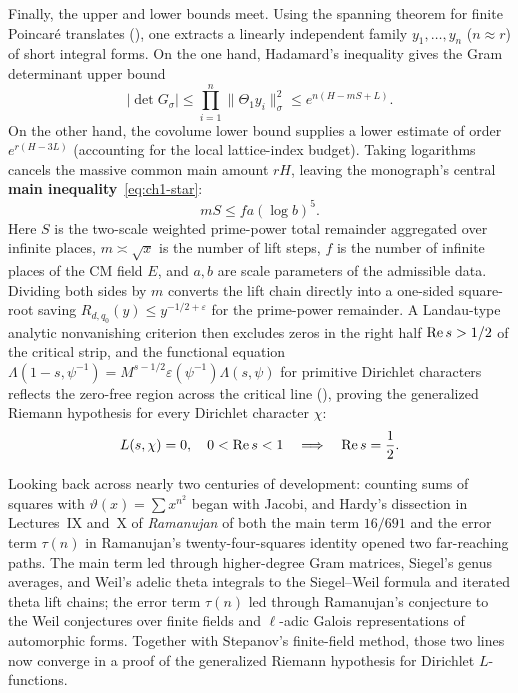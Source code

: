 Finally, the upper and lower bounds meet. Using the spanning theorem for finite Poincaré translates (), one extracts a linearly independent family $y_1,\ldots,y_n$ ($n\approx r$) of short integral forms. On the one hand, Hadamard's inequality gives the Gram determinant upper bound
\[
|\det G_\sigma|\le\prod_{i=1}^{n}\|\Theta_1 y_i\|_\sigma^2\le e^{n(H-mS+L)}.
\]
On the other hand, the covolume lower bound supplies a lower estimate of order $e^{r(H-3L)}$ (accounting for the local lattice-index budget). Taking logarithms cancels the massive common main amount $rH$, leaving the monograph's central \textbf{main inequality}~\eqref{eq:ch1-star}:
\[
mS\le fa(\log b)^5.
\]
Here $S$ is the two-scale weighted prime-power total remainder aggregated over infinite places, $m\asymp\sqrt{x}$ is the number of lift steps, $f$ is the number of infinite places of the CM field $E$, and $a,b$ are scale parameters of the admissible data. Dividing both sides by $m$ converts the lift chain directly into a one-sided square-root saving $R_{d,q_0}(y)\le y^{-1/2+\varepsilon}$ for the prime-power remainder. A Landau-type analytic nonvanishing criterion then excludes zeros in the right half $\operatorname{Re} s>1/2$ of the critical strip, and the functional equation $\Lambda(1-s,\psi^{-1})=M^{s-1/2}\varepsilon(\psi^{-1})\Lambda(s,\psi)$ for primitive Dirichlet characters reflects the zero-free region across the critical line (), proving the generalized Riemann hypothesis for every Dirichlet character $\chi$:
\[
L(s,\chi)=0,\quad 0<\operatorname{Re} s<1
\quad\Longrightarrow\quad
\operatorname{Re} s=\frac{1}{2}.
\]

Looking back across nearly two centuries of development: counting sums of squares with $\vartheta(x)=\sum x^{n^2}$ began with Jacobi, and Hardy's dissection in Lectures~IX and~X of \emph{Ramanujan} of both the main term $16/691$ and the error term $\tau(n)$ in Ramanujan's twenty-four-squares identity opened two far-reaching paths. The main term led through higher-degree Gram matrices, Siegel's genus averages, and Weil's adelic theta integrals to the Siegel--Weil formula and iterated theta lift chains; the error term $\tau(n)$ led through Ramanujan's conjecture to the Weil conjectures over finite fields and $\ell$-adic Galois representations of automorphic forms. Together with Stepanov's finite-field method, those two lines now converge in a proof of the generalized Riemann hypothesis for Dirichlet $L$-functions.

